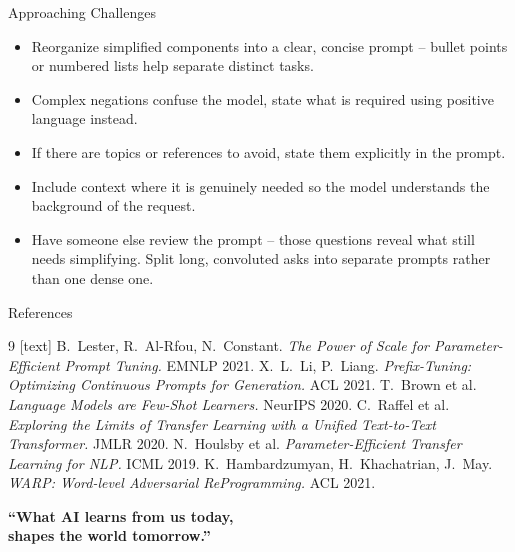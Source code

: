 \documentclass[aspectratio=169,10pt]{beamer}
\begin{document}
\begin{frame}{Approaching Challenges}
  \small
  \begin{itemize}\itemsep8pt
    \item \small {} Reorganize simplified components into
      a clear, concise prompt -- bullet points or numbered lists help
      separate distinct tasks.
    \item \small {} Complex negations confuse the model,
      state what is required using positive language instead.
    \item \small {} If there are topics or references to
      avoid, state them explicitly in the prompt.
    \item \small {} Include context where it is genuinely needed
      so the model understands the background of the request.
    \item \small {} Have someone else review the
      prompt -- those questions reveal what still needs simplifying. Split
      long, convoluted asks into separate prompts rather than one dense one.
  \end{itemize}
\end{frame}




\begin{frame}{References}
  \small
  \begin{thebibliography}{9}
    [text]
     B.~Lester, R.~Al-Rfou, N.~Constant.
      \emph{The Power of Scale for Parameter-Efficient Prompt Tuning.} EMNLP 2021.
     X.~L.~Li, P.~Liang.
      \emph{Prefix-Tuning: Optimizing Continuous Prompts for Generation.} ACL 2021.
     T.~Brown et al.
      \emph{Language Models are Few-Shot Learners.} NeurIPS 2020.
     C.~Raffel et al.
      \emph{Exploring the Limits of Transfer Learning with a Unified Text-to-Text
      Transformer.} JMLR 2020.
     N.~Houlsby et al.
      \emph{Parameter-Efficient Transfer Learning for NLP.} ICML 2019.
     K.~Hambardzumyan, H.~Khachatrian, J.~May.
      \emph{WARP: Word-level Adversarial ReProgramming.} ACL 2021.
  \end{thebibliography}
\end{frame}

\begingroup
{}
\begin{frame}[plain]
  \begin{center}
    \vfill
    {\fontsize{23}{29}\selectfont\bfseries\color{ptbg}
    ``What AI learns from us today,\\
    shapes the world tomorrow.''\par}
    \vfill
  \end{center}
\end{frame}
\endgroup
\end{document}
